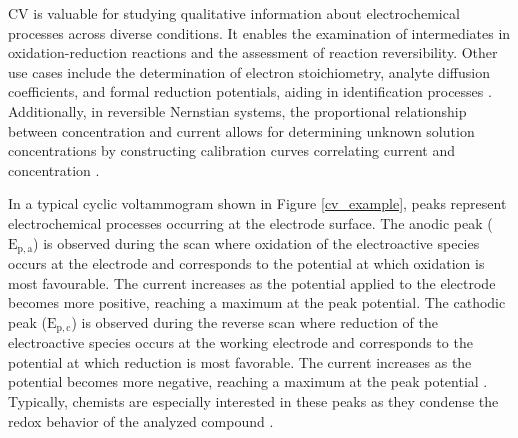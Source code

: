 CV is valuable for studying qualitative information about electrochemical processes across diverse conditions. It enables the examination of intermediates in oxidation-reduction reactions and the assessment of reaction reversibility. Other use cases include the determination of electron stoichiometry, analyte diffusion coefficients, and formal reduction potentials, aiding in identification processes \cite{Nicholson1964}. Additionally, in reversible Nernstian systems, the proportional relationship between concentration and current allows for determining unknown solution concentrations by constructing calibration curves correlating current and concentration \cite{Libretexts_2023}.

In a typical cyclic voltammogram shown in Figure \ref{cv_example}, peaks represent electrochemical processes occurring at the electrode surface. The anodic peak ($\mathrm{E_{p, a}}$) is observed during the scan where oxidation of the electroactive species occurs at the electrode and corresponds to the potential at which oxidation is most favourable. The current increases as the potential applied to the electrode becomes more positive, reaching a maximum at the peak potential. The cathodic peak ($\mathrm{E_{p, c}}$) is observed during the reverse scan where reduction of the electroactive species occurs at the working electrode and corresponds to the potential at which reduction is most favorable. The current increases as the potential becomes more negative, reaching a maximum at the peak potential \cite{GRIMSHAW20001}. Typically, chemists are especially interested in these peaks as they condense the redox behavior of the analyzed compound \cite{Faulkner1983}.
